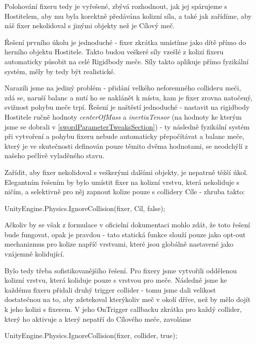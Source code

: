 Polohování fixeru tedy je vyřešené, zbývá rozhodnout, jak jej spárujeme s Hostitelem, aby mu byla korektně předávána kolizní síla, a také jak zařídíme, aby náš fixer nekolidoval s jinými objekty než je Cílový meč.

Řešení prvního úkolu je jednoduché - fixer zkrátka umístíme jako dítě přímo do herního objektu Hostitele. Takto budou veškeré síly vzešlé z kolizí fixeru automaticky působit na celé Rigidbody meče. Síly takto aplikuje přímo fyzikální systém, měly by tedy být realistické. 

Narazili jsme na jediný problém - přidání velkého neforemného collideru meči, zdá se, naruší balanc a nutí ho se naklánět k místu, kam je fixer zrovna natočený, svižnost pohybu meče trpí. Řešení je naštěstí jednoduché - nastavit na rigidbody Hostitele ručně hodnoty \textit{centerOfMass} a \textit{inertiaTensor} (na hodnoty ke kterým jsme se dobrali v \ref{swordParameterTweaksSection}) - ty následně fyzikální systém při vytvoření a pohybu fixeru nebude automaticky přepočítávat a balanc meče, který je ve skutečnosti definován pouze těmito dvěma hodnotami, se neodchýlí z našeho pečlivě vyladěného stavu. 

\bigbreak

Zařídit, aby fixer nekolidoval s veškerými dalšími objekty, je nepatrně těžší úkol. Elegantním řešením by bylo umístit fixer na kolizní vrstvu, která nekoliduje s ničím, a selektivně pro něj zapnout kolize pouze s collidery Cíle - zhruba takto:
\begin{code}
 UnityEngine.Physics.IgnoreCollision(fixer, Cíl, false);
\end{code}
Ačkoliv by se však z formulace v oficielní dokumentaci mohlo zdát, že toto řešení bude fungovat, opak je pravdou - tato statická funkce slouží pouze jako opt-out mechanizmus pro kolize napříč vrstvami, které jsou globálně nastavené jako vzájemně kolidující.

Bylo tedy třeba sofistikovanějšího řešení. Pro fixery jsme vytvořili oddělenou kolizní vrstvu, která koliduje pouze s vrstvou pro meče. Následně jsme ke každému fixeru přidali druhý trigger collider - tomu jsme dali velikost dostatečnou na to, aby zdetekoval kterýkoliv meč v okolí dříve, než by mělo dojít k jeho kolizi s fixerem. V jeho OnTrigger callbacku zkrátka pro každý collider, který ho aktivuje a který nepatří do Cílového meče, zavoláme 
\begin{code}
 UnityEngine.Physics.IgnoreCollision(fixer, collider, true);
\end{code}

